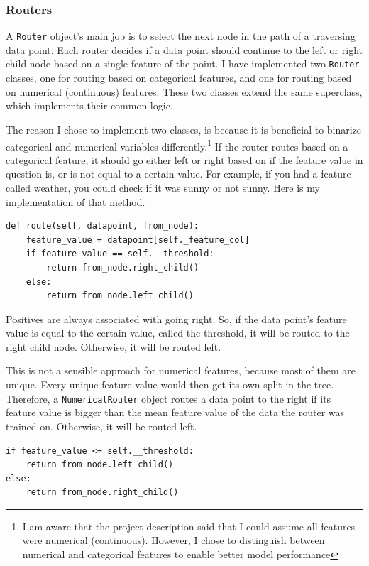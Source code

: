 \documentclass{article}
\begin{document}
\subsubsection{Routers}

A \texttt{Router} object's main job is to select the next node in the path of a traversing data point.
Each router decides if a data point should continue to the left or right child node
based on a single feature of the point.
I have implemented two \texttt{Router} classes, one for routing based on categorical features,
and one for routing based on numerical (continuous) features.
These two classes extend the same superclass, which implements their common logic.

The reason I chose to implement two classes, is because it is beneficial to binarize categorical
and numerical variables differently.\footnote{I am aware that the project description said that I could assume all features were numerical (continuous). However, I chose to distinguish between numerical and categorical features to enable better model performance}
If the router routes based on a categorical feature,
it should go either left or right based on if the feature value in question is,
or is not equal to a certain value. 
For example, if you had a feature called weather, you could check if it was sunny or not sunny.
Here is my implementation of that method.

\begin{verbatim}
def route(self, datapoint, from_node):
    feature_value = datapoint[self._feature_col]
    if feature_value == self.__threshold:
        return from_node.right_child()
    else:
        return from_node.left_child()
\end{verbatim}

Positives are always associated with going right. 
So, if the data point's feature value is equal to the certain value, called the threshold,
it will be routed to the right child node. Otherwise, it will be routed left.

This is not a sensible approach for numerical features,
because most of them are unique.
Every unique feature value would then get its own split in the tree.
Therefore, a \texttt{NumericalRouter} object routes a data point to the right
if its feature value is bigger than the mean feature value of the data the router was trained on.
Otherwise, it will be routed left.

\begin{verbatim}
if feature_value <= self.__threshold:
    return from_node.left_child()
else:
    return from_node.right_child()
\end{verbatim}
\end{document}
